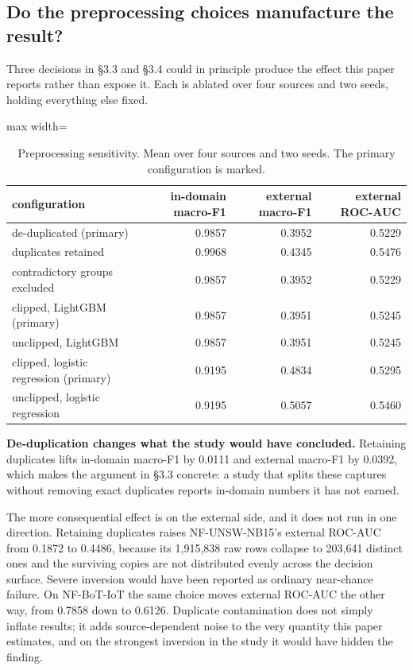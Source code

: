 \documentclass[preprint,12pt]{elsarticle}
\begin{document}
\subsection{Do the preprocessing choices manufacture the result?}

Three decisions in \S{}3.3 and \S{}3.4 could in principle produce the effect this paper reports rather than expose it. Each is ablated over four sources and two seeds, holding everything else fixed.

\begin{table}[htbp]\centering\scriptsize
\caption{Preprocessing sensitivity. Mean over four sources and two seeds. The primary configuration is marked.}
\begin{adjustbox}{max width=\textwidth}\begin{tabular}{lrrr}
\toprule
configuration & in-domain macro-F1 & external macro-F1 & external ROC-AUC \\
\midrule
de-duplicated (primary) & 0.9857 & 0.3952 & 0.5229 \\
duplicates retained & 0.9968 & 0.4345 & 0.5476 \\
contradictory groups excluded & 0.9857 & 0.3952 & 0.5229 \\
clipped, LightGBM (primary) & 0.9857 & 0.3951 & 0.5245 \\
unclipped, LightGBM & 0.9857 & 0.3951 & 0.5245 \\
clipped, logistic regression (primary) & 0.9195 & 0.4834 & 0.5295 \\
unclipped, logistic regression & 0.9195 & 0.5057 & 0.5460 \\
\bottomrule
\end{tabular}\end{adjustbox}
\end{table}

\textbf{De-duplication changes what the study would have concluded.} Retaining duplicates lifts in-domain macro-F1 by 0.0111 and external macro-F1 by 0.0392, which makes the argument in \S{}3.3 concrete: a study that splits these captures without removing exact duplicates reports in-domain numbers it has not earned.

The more consequential effect is on the external side, and it does not run in one direction. Retaining duplicates raises NF-UNSW-NB15's external ROC-AUC from 0.1872 to 0.4486, because its 1,915,838 raw rows collapse to 203,641 distinct ones and the surviving copies are not distributed evenly across the decision surface. Severe inversion would have been reported as ordinary near-chance failure. On NF-BoT-IoT the same choice moves external ROC-AUC the other way, from 0.7858 down to 0.6126. Duplicate contamination does not simply inflate results; it adds source-dependent noise to the very quantity this paper estimates, and on the strongest inversion in the study it would have hidden the finding.
\end{document}
